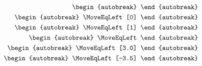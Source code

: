 \documentclass{article}
\begin{document}
\begin{align}
  \begin{autobreak}
    
  \end{autobreak}
  \\
  \begin{autobreak}
    \MoveEqLeft[0]
    
  \end{autobreak}
  \\
  \begin{autobreak}
    \MoveEqLeft[1]
    
  \end{autobreak}
  \\
  \begin{autobreak}
    \MoveEqLeft
    
  \end{autobreak}
  \\
  \begin{autobreak}
    \MoveEqLeft[3.0]
    
  \end{autobreak}
  \\
  \begin{autobreak}
    \MoveEqLeft[-3.5]
    
  \end{autobreak}
\end{align}
\end{document}
